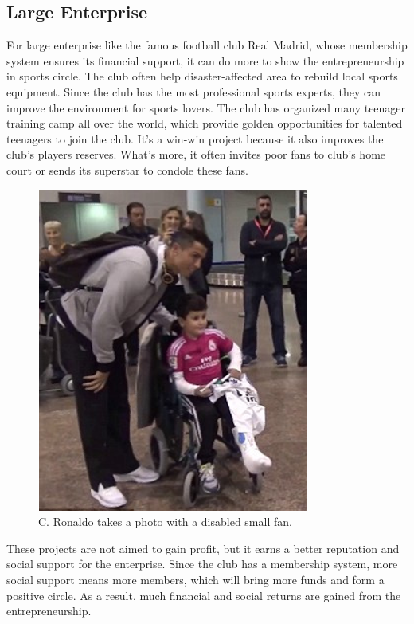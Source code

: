 \documentclass[12pt]{article}
\begin{document}
\subsection{Large Enterprise}
For large enterprise like the famous football club Real Madrid, whose membership system ensures its financial support, it can do more to show the entrepreneurship in sports circle. The club often help disaster-affected area to rebuild local sports equipment. Since the club has the most professional sports experts, they can improve the environment for sports lovers. The club has organized many teenager training camp all over the world, which provide golden opportunities for talented teenagers to join the club. It's a win-win project because it also improves the club's players reserves. What's more, it often invites poor fans to club's home court or sends its superstar to condole these fans.
\begin{figure}[H]
\centering
\includegraphics[scale = 0.6]{P3.jpg}
\caption{C. Ronaldo takes a photo with a disabled small fan. }
\end{figure} 
These projects are not aimed to gain profit, but it earns a better reputation and social support for the enterprise. Since the club has a membership system, more social support means more members, which will bring more funds and form a positive circle. As a result, much financial and social returns are gained from the entrepreneurship.
\end{document}
